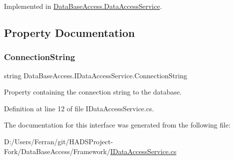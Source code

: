 Implemented in \mbox{\hyperlink{classDataBaseAccess_1_1DataAccessService_a422e6ead446da4cfcdc33255193ac92e}{Data\+Base\+Access.\+Data\+Access\+Service}}.



\subsection{Property Documentation}
\mbox{\label{interfaceDataBaseAccess_1_1IDataAccessService_aced282143a1c60f5cc534af50cf10b32}} 
\subsubsection{\texorpdfstring{ConnectionString}{ConnectionString}}
{\footnotesize\ttfamily string Data\+Base\+Access.\+I\+Data\+Access\+Service.\+Connection\+String\hspace{0.3cm}{\ttfamily [get]}}



Property containing the connection string to the database. 



Definition at line 12 of file I\+Data\+Access\+Service.\+cs.



The documentation for this interface was generated from the following file\+:\begin{DoxyCompactItemize}
\item 
D\+:/\+Users/\+Ferran/git/\+H\+A\+D\+S\+Project-\/\+Fork/\+Data\+Base\+Access/\+Framework/\mbox{\hyperlink{IDataAccessService_8cs}{I\+Data\+Access\+Service.\+cs}}\end{DoxyCompactItemize}
